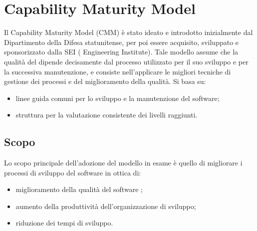 \documentclass[PdQ.tex]{subfiles}
\begin{document}
\hypertarget{CMM}{\section{Capability Maturity Model}}
	Il Capability Maturity Model (CMM) è stato ideato e introdotto inizialmente dal Dipartimento della Difesa statunitense, per poi essere acquisito, sviluppato e sponsorizzato dalla SEI ( Engineering Institute). Tale modello
assume che la qualità del  dipende decisamente dal processo utilizzato per il suo sviluppo e per la successiva manutenzione, e consiste nell'applicare le migliori tecniche di gestione dei processi e del miglioramento della qualità. Si basa su:
	\begin{itemize}
		\item linee guida comuni per lo sviluppo e la manutenzione del software;
		\item struttura per la valutazione consistente dei livelli raggiunti.
	\end{itemize}

	\subsection{Scopo}
	Lo scopo principale dell'adozione del modello in esame è quello di migliorare i processi di sviluppo del software in ottica di:
	\begin{itemize}
		\item miglioramento della qualità del software ;
		\item aumento della produttività dell'organizzazione di sviluppo;
		\item riduzione dei tempi di sviluppo.
	\end{itemize}
\end{document}
